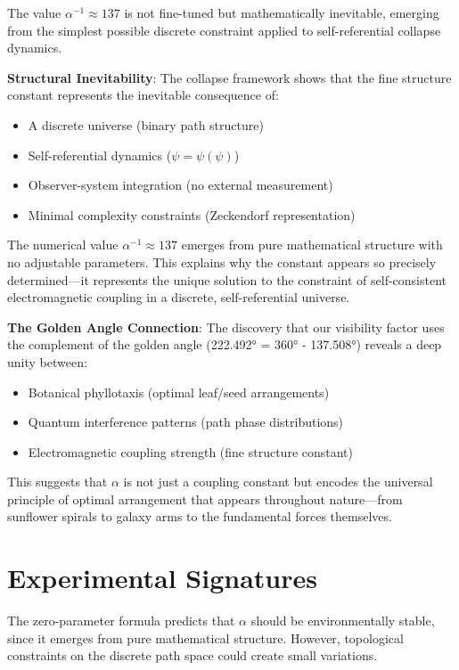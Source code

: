 \documentclass[%
 reprint,
 amsmath,amssymb,
 aps,
 prd,
 10pt,
 nofootinbib,      %
 longbibliography  %
]{revtex4-2}
\theoremstyle{definition}
\theoremstyle{remark}
\begin{document}
The value $\alpha^{-1} \approx 137$ is not fine-tuned but mathematically inevitable, emerging from the simplest possible discrete constraint applied to self-referential collapse dynamics.

\textbf{Structural Inevitability}: The collapse framework shows that the fine structure constant represents the inevitable consequence of:
\begin{itemize}
\item A discrete universe (binary path structure)
\item Self-referential dynamics ($\psi = \psi(\psi)$)
\item Observer-system integration (no external measurement)
\item Minimal complexity constraints (Zeckendorf representation)
\end{itemize}

The numerical value $\alpha^{-1} \approx 137$ emerges from pure mathematical structure with no adjustable parameters. This explains why the constant appears so precisely determined—it represents the unique solution to the constraint of self-consistent electromagnetic coupling in a discrete, self-referential universe.

\textbf{The Golden Angle Connection}: The discovery that our visibility factor uses the complement of the golden angle (222.492° = 360° - 137.508°) reveals a deep unity between:
\begin{itemize}
\item Botanical phyllotaxis (optimal leaf/seed arrangements)
\item Quantum interference patterns (path phase distributions)
\item Electromagnetic coupling strength (fine structure constant)
\end{itemize}

This suggests that $\alpha$ is not just a coupling constant but encodes the universal principle of optimal arrangement that appears throughout nature—from sunflower spirals to galaxy arms to the fundamental forces themselves.

\section{Experimental Signatures}\label{sec:exp}

The zero-parameter formula predicts that $\alpha$ should be environmentally stable,
since it emerges from pure mathematical structure. However, topological constraints
on the discrete path space could create small variations.
\end{document}

